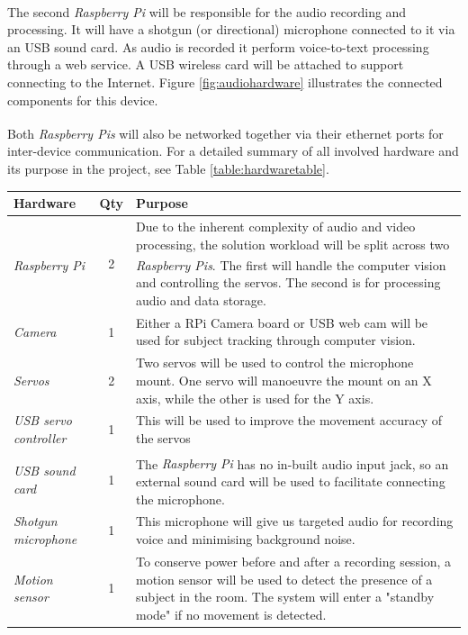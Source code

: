 \documentclass[11pt,a4paper,titlepage]{report}
\newcommand{\rpi}{\textit{Raspberry Pi\textsuperscript{\textregistered}}}
\newcommand{\rpis}{\textit{Raspberry Pi\textsuperscript{\textregistered}s}}
\begin{document}
The second \rpi\xspace will be responsible for the audio recording and processing. It will have a shotgun (or directional) microphone connected to it via an USB sound card.  As audio is recorded it perform voice-to-text processing through a web service. A USB wireless card will be attached to support connecting to the Internet. Figure \ref{fig:audiohardware} illustrates the connected components for this device.

Both \rpis\xspace will also be networked together via their ethernet ports for inter-device communication. For a detailed summary of all involved hardware and its purpose in the project, see Table \ref{table:hardwaretable}. 


\begin{center}
\begin{table}
{\tabulinesep=1.8mm
\begin{tabu}{ lcp{7cm} }

    \textbf{Hardware} & \textbf{Qty} & \textbf{Purpose} \\ \hline
    
    \rpi & 2 & Due to the inherent complexity of audio and video processing, the solution workload will be split across two \rpis. The first will handle the computer vision and controlling the servos. The second is for processing audio and data storage.\\ 

    \textit{Camera} & 1 & Either a RPi Camera board or USB web cam will be used for subject tracking through computer vision. \\ 
    
   \textit{Servos} & 2 & Two servos will be used to control the microphone mount. One servo will manoeuvre the mount on an X axis, while the other is used for the Y axis. \\ 
        
    \textit{USB servo controller} & 1 & This will be used to improve the movement accuracy of the servos \\ 
    
    \textit{USB sound card} & 1 & The \rpi\xspace has no in-built audio input jack, so an external sound card will be used to facilitate connecting the microphone. \\ 
    
    \textit{Shotgun microphone} & 1 & This microphone will give us targeted audio for recording voice and minimising background noise. \\ 
    
    \textit{Motion sensor} & 1 & To conserve power before and after a recording session, a motion sensor will be used to detect the presence of a subject in the room. The system will enter a "standby mode" if no movement is detected.\\ 


\end{tabu}}
\end{table}
\end{center}
\end{document}
